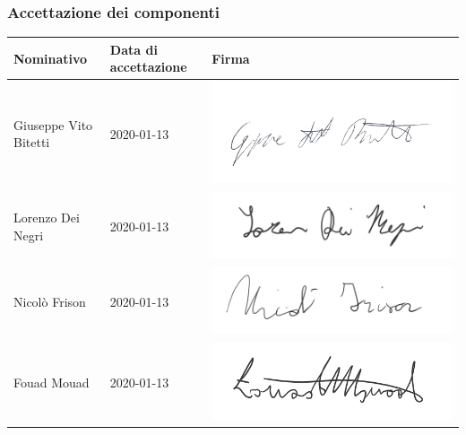 		\subsubsection{Accettazione dei componenti}
			
			\begin{table}[H]
				\centering
				\begin{tabular}{|l|l|l|}
					\hline
					\textbf{Nominativo} & \textbf{Data di accettazione} & \textbf{Firma} \\ \hline
					Giuseppe Vito Bitetti & 2020-01-13 & \includegraphics[scale=0.1]{images/firme/peppe} \\ \hline
					Lorenzo Dei Negri & 2020-01-13 & \includegraphics[scale=0.6]{images/firme/lorenzo} \\ \hline
					Nicolò Frison & 2020-01-13 & \includegraphics[scale=0.6]{images/firme/nicolo} \\ \hline
					Fouad Mouad & 2020-01-13 & \includegraphics[scale=0.6]{images/firme/fouad} \\ \hline

\end{tabular}
\end{table}
